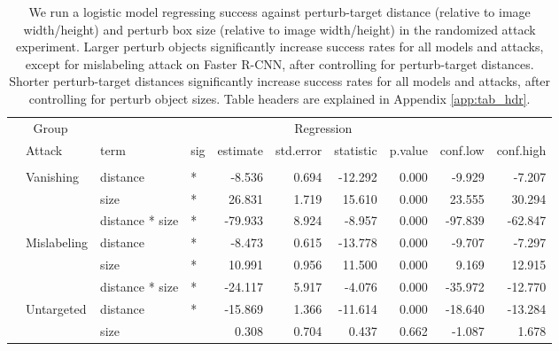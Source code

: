 \documentclass[
]{article}
\begin{document}
\begin{longtable}[t]{llllrrrrrr}
\caption{\label{tab:perturb_bbox_and_object_dist_table}We run a logistic model regressing success against perturb-target distance (relative to image width/height) and perturb box size (relative to image width/height) in the randomized attack experiment. Larger perturb objects significantly increase success rates for all models and attacks, except for mislabeling attack on Faster R-CNN, after controlling for perturb-target distances. Shorter perturb-target distances significantly increase success rates for all models and attacks, after controlling for perturb object sizes. Table headers are explained in Appendix \ref{app:tab_hdr}.}\\
\toprule
\multicolumn{2}{c}{Group} & \multicolumn{8}{c}{Regression} \\
\cmidrule(l{3pt}r{3pt}){1-2} \cmidrule(l{3pt}r{3pt}){3-10}
 & Attack & term & sig & estimate & std.error & statistic & p.value & conf.low & conf.high\\
\midrule
\addlinespace[0.3em]
\multicolumn{10}{l}{\textbf{YOLOv3}}\\
\hspace{1em} & Vanishing & distance & * & -8.536 & 0.694 & -12.292 & 0.000 & -9.929 & -7.207\\
\cmidrule{3-10}\nopagebreak
\hspace{1em} &  & size & * & 26.831 & 1.719 & 15.610 & 0.000 & 23.555 & 30.294\\
\cmidrule{3-10}\nopagebreak
\hspace{1em} &  & distance * size & * & -79.933 & 8.924 & -8.957 & 0.000 & -97.839 & -62.847\\
\cmidrule{2-10}\nopagebreak
\hspace{1em} & Mislabeling & distance & * & -8.473 & 0.615 & -13.778 & 0.000 & -9.707 & -7.297\\
\cmidrule{3-10}\nopagebreak
\hspace{1em} &  & size & * & 10.991 & 0.956 & 11.500 & 0.000 & 9.169 & 12.915\\
\cmidrule{3-10}\nopagebreak
\hspace{1em} &  & distance * size & * & -24.117 & 5.917 & -4.076 & 0.000 & -35.972 & -12.770\\
\cmidrule{2-10}\nopagebreak
\hspace{1em} & Untargeted & distance & * & -15.869 & 1.366 & -11.614 & 0.000 & -18.640 & -13.284\\
\cmidrule{3-10}\nopagebreak
\hspace{1em} &  & size &  & 0.308 & 0.704 & 0.437 & 0.662 & -1.087 & 1.678\\

\end{longtable}
\end{document}
